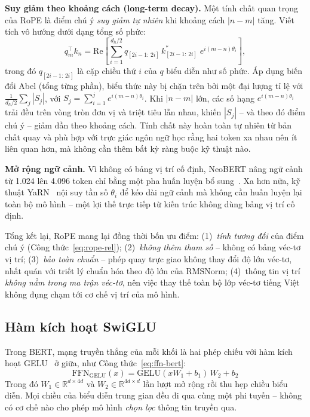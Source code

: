 \textbf{Suy giảm theo khoảng cách (long-term decay).}
Một tính chất quan trọng của RoPE là điểm chú ý \textit{suy giảm tự nhiên} khi khoảng
cách $|n - m|$ tăng. Viết tích vô hướng dưới dạng tổng số phức:
\begin{equation}
  \label{eq:rope-complex}
  q_m^\top k_n = \mathrm{Re}\!\left[
    \sum_{i=1}^{d_h/2} q_{[2i-1:\,2i]}\,k_{[2i-1:\,2i]}^*\;e^{i(m-n)\theta_i}
  \right],
\end{equation}
trong đó $q_{[2i-1:\,2i]}$ là cặp chiều thứ $i$ của $q$ biểu diễn như số phức. Áp dụng biến
đổi Abel (tổng từng phần), biểu thức này bị chặn trên bởi một đại lượng tỉ lệ với
$\frac{1}{d_h/2}\sum_{j}|S_j|$, với $S_j = \sum_{i=1}^{j}e^{i(m-n)\theta_i}$. Khi
$|n-m|$ lớn, các số hạng $e^{i(m-n)\theta_i}$ trải đều trên vòng tròn đơn vị và triệt
tiêu lẫn nhau, khiến $|S_j|$ -- và theo đó điểm chú ý -- giảm dần theo khoảng cách. Tính
chất này hoàn toàn tự nhiên từ bản chất quay và phù hợp với trực giác ngôn ngữ học rằng
hai token xa nhau nên ít liên quan hơn, mà không cần thêm bất kỳ ràng buộc kỹ thuật nào.

\textbf{Mở rộng ngữ cảnh.}
Vì không có bảng vị trí cố định, NeoBERT nâng ngữ cảnh từ 1.024 lên 4.096 token chỉ bằng
một pha huấn luyện bổ sung~\cite{lebreton2025neobert}. Xa hơn nữa, kỹ thuật
YaRN~\cite{peng2023yarn} nội suy tần số $\theta_i$ để kéo dài ngữ cảnh mà không cần
huấn luyện lại toàn bộ mô hình -- một lợi thế trực tiếp từ kiến trúc không dùng bảng vị
trí cố định.

Tổng kết lại, RoPE mang lại đồng thời bốn ưu điểm: (1)~\textit{tính tương đối} của điểm
chú ý (Công thức~\eqref{eq:rope-rel}); (2)~\textit{không thêm tham số} -- không có bảng
véc-tơ vị trí; (3)~\textit{bảo toàn chuẩn} -- phép quay trực giao không thay đổi độ lớn
véc-tơ, nhất quán với triết lý chuẩn hóa theo độ lớn của RMSNorm; (4)~thông tin vị trí
\textit{không nằm trong ma trận véc-tơ}, nên việc thay thế toàn bộ lớp véc-tơ tiếng Việt
không đụng chạm tới cơ chế vị trí của mô hình.

\subsection{Hàm kích hoạt SwiGLU}
\label{subsec:swiglu}

Trong BERT, mạng truyền thẳng của mỗi khối là hai phép chiếu với hàm kích hoạt
GELU~\cite{hendrycks2016gelu} ở giữa, như Công thức~\eqref{eq:ffn-bert}:
\begin{equation}
  \label{eq:ffn-bert}
  \mathrm{FFN}_{\mathrm{GELU}}(x) = \mathrm{GELU}(x W_1 + b_1)\, W_2 + b_2
\end{equation}
Trong đó $W_1 \in \mathbb{R}^{d \times 4d}$ và $W_2 \in \mathbb{R}^{4d \times d}$ lần
lượt mở rộng rồi thu hẹp chiều biểu diễn. Mọi chiều của biểu diễn trung gian đều đi qua
cùng một phi tuyến -- không có cơ chế nào cho phép mô hình \textit{chọn lọc} thông tin
truyền qua.

